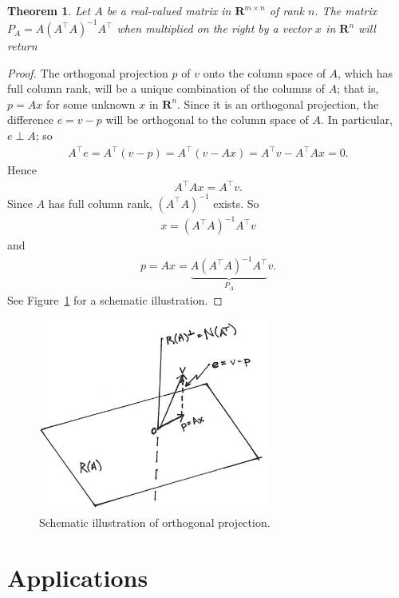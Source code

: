 \documentclass[]{article}
\theoremstyle{plain}
\newtheorem{thm}{Theorem}
\theoremstyle{definition}
\theoremstyle{remark}
\newcommand{\reals}{\mathbf{R}}
\begin{document}
\begin{thm}
Let $A$ be a real-valued matrix in $\reals^{m \times n}$ of rank $n$.
The matrix $P_A = A (A^\top A)^{-1} A^\top$ when multiplied on the
right by a vector $x$ in $\reals^n$ will return 
\end{thm}
\begin{proof}
The orthogonal projection $p$ of $v$ onto the column space of $A$, which has
full column rank, will be a unique combination of the columns of $A$; that is,
$p=Ax$ for some unknown $x$ in $\reals^n$.  Since it is an orthogonal
projection, the difference $e=v-p$ will be orthogonal to the column space of
$A$.  In particular, $e \perp A$; so
\begin{align*}
A^\top e =  A^\top(v-p) =  A^\top(v-Ax) =  A^\top v -  A^\top Ax = 0.
\end{align*}
Hence
\begin{align*}
A^\top Ax = A^\top v.
\end{align*}
Since $A$ has full column rank, $(A^\top A)^{-1}$ exists. So
\begin{align*}
x = (A^\top A)^{-1}A^\top v
\end{align*}
and
\begin{align*}
p = Ax = \underbrace{A(A^\top A)^{-1}A^\top}_{P_A} v.
\end{align*}
See Figure~\ref{fig:orthoprojection} for a schematic illustration.
\end{proof}
\begin{figure}
  \begin{centering}
    \includegraphics[width=3in]{fig/orthoproject.png}\par
  \end{centering}
  \caption{\label{fig:orthoprojection}Schematic illustration of orthogonal projection.}
\end{figure}


\section{Applications}\label{applications}
\end{document}
